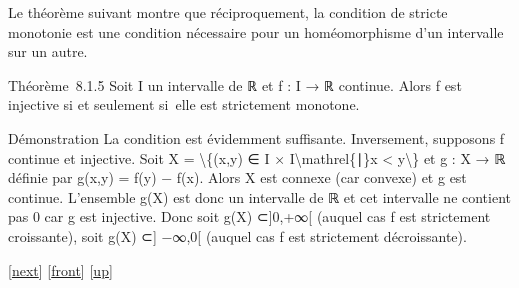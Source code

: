 \documentclass[]{article}
\begin{document}
Le théorème suivant montre que réciproquement, la condition de stricte
monotonie est une condition nécessaire pour un homéomorphisme d'un
intervalle sur un autre.

Théorème~8.1.5 Soit I un intervalle de ℝ et f : I → ℝ continue. Alors f
est injective si et seulement si~elle est strictement monotone.

Démonstration La condition est évidemment suffisante. Inversement,
supposons f continue et injective. Soit X = \textbackslash{}\{(x,y) ∈ I
× I\textbackslash{}mathrel\{∣\}x \textless{} y\textbackslash{}\} et g :
X → ℝ définie par g(x,y) = f(y) − f(x). Alors X est connexe (car
convexe) et g est continue. L'ensemble g(X) est donc un intervalle de ℝ
et cet intervalle ne contient pas 0 car g est injective. Donc soit g(X)
⊂{]}0,+∞{[} (auquel cas f est strictement croissante), soit g(X) ⊂{]}
−∞,0{[} (auquel cas f est strictement décroissante).

{[}\href{coursse45.html}{next}{]} {[}\href{coursse44.html}{front}{]}
{[}\href{coursch9.html\#coursse44.html}{up}{]}
\end{document}
